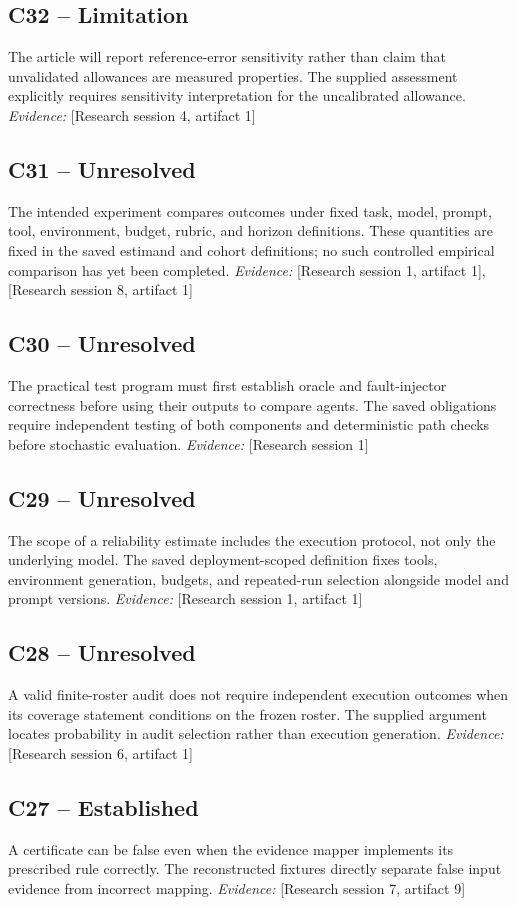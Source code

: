 \documentclass[11pt]{article}
\begin{document}
\begin{sloppypar}
\subsection{C32 -- Limitation}
The article will report reference-error sensitivity rather than claim that unvalidated allowances are measured properties.
The supplied assessment explicitly requires sensitivity interpretation for the uncalibrated allowance.
\textit{Evidence: }[Research session 4, artifact 1]
\subsection{C31 -- Unresolved}
The intended experiment compares outcomes under fixed task, model, prompt, tool, environment, budget, rubric, and horizon definitions.
These quantities are fixed in the saved estimand and cohort definitions; no such controlled empirical comparison has yet been completed.
\textit{Evidence: }[Research session 1, artifact 1], [Research session 8, artifact 1]
\subsection{C30 -- Unresolved}
The practical test program must first establish oracle and fault-injector correctness before using their outputs to compare agents.
The saved obligations require independent testing of both components and deterministic path checks before stochastic evaluation.
\textit{Evidence: }[Research session 1]
\subsection{C29 -- Unresolved}
The scope of a reliability estimate includes the execution protocol, not only the underlying model.
The saved deployment-scoped definition fixes tools, environment generation, budgets, and repeated-run selection alongside model and prompt versions.
\textit{Evidence: }[Research session 1, artifact 1]
\subsection{C28 -- Unresolved}
A valid finite-roster audit does not require independent execution outcomes when its coverage statement conditions on the frozen roster.
The supplied argument locates probability in audit selection rather than execution generation.
\textit{Evidence: }[Research session 6, artifact 1]
\subsection{C27 -- Established}
A certificate can be false even when the evidence mapper implements its prescribed rule correctly.
The reconstructed fixtures directly separate false input evidence from incorrect mapping.
\textit{Evidence: }[Research session 7, artifact 9]

\end{sloppypar}
\end{document}

